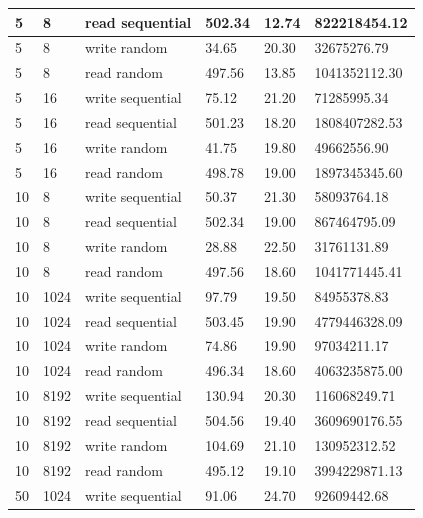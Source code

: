\begin{tabularx}{\textwidth}{|X|X|X|X|X|X|}
    \hline
    \rowcolor{lightgray} 5 & 8 & read sequential & 502.34 & 12.74 & 822218454.12 \\
    \hline
    \rowcolor{lightgray} 5 & 8 & write random & 34.65 & 20.30 & 32675276.79 \\
    \hline
    \rowcolor{lightgray} 5 & 8 & read random & 497.56 & 13.85 & 1041352112.30 \\
    \hline
    \hline
    5 & 16 & write sequential & 75.12 & 21.20 & 71285995.34 \\
    \hline
    5 & 16 & read sequential & 501.23 & 18.20 & 1808407282.53 \\
    \hline
    5 & 16 & write random & 41.75 & 19.80 & 49662556.90 \\
    \hline
    5 & 16 & read random & 498.78 & 19.00 & 1897345345.60 \\
    \hline
    \hline
    \rowcolor{lightgray} 10 & 8 & write sequential & 50.37 & 21.30 & 58093764.18 \\
    \hline
    \rowcolor{lightgray} 10 & 8 & read sequential & 502.34 & 19.00 & 867464795.09 \\
    \hline
    \rowcolor{lightgray} 10 & 8 & write random & 28.88 & 22.50 & 31761131.89 \\
    \hline
    \rowcolor{lightgray} 10 & 8 & read random & 497.56 & 18.60 & 1041771445.41 \\
    \hline
    \hline
    10 & 1024 & write sequential & 97.79 & 19.50 & 84955378.83 \\
    \hline
    10 & 1024 & read sequential & 503.45 & 19.90 & 4779446328.09 \\
    \hline
    10 & 1024 & write random & 74.86 & 19.90 & 97034211.17 \\
    \hline
    10 & 1024 & read random & 496.34 & 18.60 & 4063235875.00 \\
    \hline
    \hline
    \rowcolor{lightgray} 10 & 8192 & write sequential & 130.94 & 20.30 & 116068249.71 \\
    \hline
    \rowcolor{lightgray} 10 & 8192 & read sequential & 504.56 & 19.40 & 3609690176.55 \\
    \hline
    \rowcolor{lightgray} 10 & 8192 & write random & 104.69 & 21.10 & 130952312.52 \\
    \hline
    \rowcolor{lightgray} 10 & 8192 & read random & 495.12 & 19.10 & 3994229871.13 \\
    \hline
    \hline
    50 & 1024 & write sequential & 91.06 & 24.70 & 92609442.68 \\

\end{tabularx}
